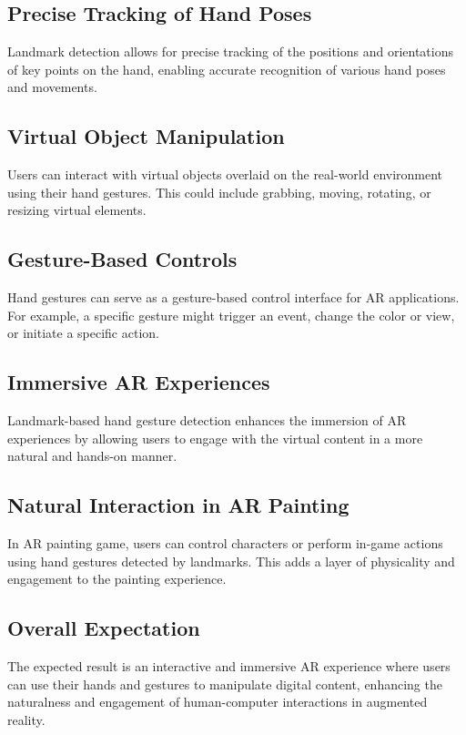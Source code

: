 \documentclass[journal]{IEEEtran}
\begin{document}
\subsection*{Precise Tracking of Hand Poses}
Landmark detection allows for precise tracking of the positions and orientations of key points on the hand, enabling accurate 
recognition of various hand poses and movements.
\subsection*{Virtual Object Manipulation}
Users can interact with virtual objects overlaid on the real-world environment using their hand gestures. This could include 
grabbing, moving, rotating, or resizing virtual elements.
\subsection*{Gesture-Based Controls}
Hand gestures can serve as a gesture-based control interface for AR applications. For example, a specific gesture might trigger 
an event, change the color or view, or initiate a specific action.
\subsection*{Immersive AR Experiences}
Landmark-based hand gesture detection enhances the immersion of AR experiences by allowing users to engage with the virtual 
content in a more natural and hands-on manner.
\subsection*{Natural Interaction in AR Painting}
In AR painting game, users can control characters or perform in-game actions using hand gestures detected by landmarks. This adds a 
layer of physicality and engagement to the painting experience.
\subsection*{Overall Expectation}
The expected result is an interactive and immersive AR experience where users can use their hands and gestures to 
manipulate digital content, enhancing the naturalness and engagement of human-computer interactions in augmented reality.
\end{document}
